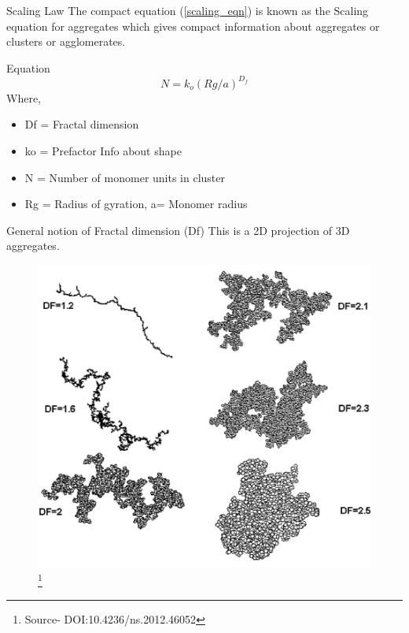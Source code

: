 \documentclass{beamer}
\begin{document}
\begin{frame}{Scaling Law}
The compact equation (\ref{scaling_eqn}) is known as the Scaling equation for aggregates which gives compact information about aggregates or clusters or agglomerates.

\begin{block}{Equation}
    \begin{equation} \label{scaling_eqn}
    N = k_o(Rg/a)^{D_f}
    \end{equation}
Where,
    \begin{itemize}
    \item {Df = Fractal dimension} %
    \item {ko = Prefactor Info about shape }
    \item {N = Number of monomer units in cluster}
    \item {Rg = Radius of gyration, a= Monomer radius}
   
    \end{itemize}
\end{block}
  
\end{frame}

\begin{frame}{General notion of Fractal dimension (Df)}
This is a 2D projection of 3D aggregates. 
    \begin{figure}[h]
        \includegraphics[scale=0.30]{diff_DF.jpg}
       \footnote{Source- DOI:10.4236/ns.2012.46052 }
    \end{figure}  
\end{frame}
\end{document}

